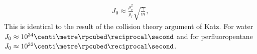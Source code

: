 %
%
\begin{align}
  J_0 \approx \frac{\rho_v^2}{\rho_l}\sqrt{\frac{\gamma}{m}},
\end{align}
This is identical to the result of the collision theory argument of Katz\cite{Katz1992}.
For water $J_0\approx 10^{34}\centi\metre \rpcubed \reciprocal\second$ and for perfluoropentane $J_0\approx 10^{32}\centi\metre \rpcubed \reciprocal\second$. 







